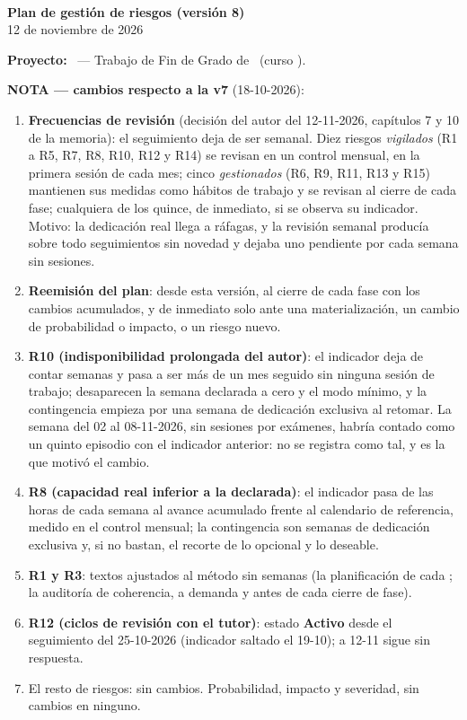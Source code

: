 \documentclass[11pt,a4paper]{article}
\begin{document}
\begin{center}
  {\Huge\bfseries\bukit}\\[0.5cm]
  {\Large\bfseries Plan de gestión de riesgos (versión 8)}\\[0.4cm]
  {\large 12 de noviembre de 2026}
\end{center}
\vspace{0.6cm}

\textbf{Proyecto:} \thesisTitle\ — Trabajo de Fin de Grado de \thesisAuthor\ (curso \thesisCourse).

\textbf{NOTA — cambios respecto a la v7} (18-10-2026):
\begin{enumerate}
  \item \textbf{Frecuencias de revisión} (decisión del autor del 12-11-2026, capítulos 7 y 10 de la memoria): el seguimiento deja de ser semanal.
  Diez riesgos \emph{vigilados} (R1 a R5, R7, R8, R10, R12 y R14) se revisan en un control mensual, en la primera sesión de cada mes; cinco \emph{gestionados} (R6, R9, R11, R13 y R15) mantienen sus medidas como hábitos de trabajo y se revisan al cierre de cada fase; cualquiera de los quince, de inmediato, si se observa su indicador.
  Motivo: la dedicación real llega a ráfagas, y la revisión semanal producía sobre todo seguimientos sin novedad y dejaba uno pendiente por cada semana sin sesiones.
  \item \textbf{Reemisión del plan}: desde esta versión, al cierre de cada fase con los cambios acumulados, y de inmediato solo ante una materialización, un cambio de probabilidad o impacto, o un riesgo nuevo.
  \item \textbf{R10 (indisponibilidad prolongada del autor)}: el indicador deja de contar semanas y pasa a ser más de un mes seguido sin ninguna sesión de trabajo; desaparecen la semana declarada a cero y el modo mínimo, y la contingencia empieza por una semana de dedicación exclusiva al retomar.
  La semana del 02 al 08-11-2026, sin sesiones por exámenes, habría contado como un quinto episodio con el indicador anterior: no se registra como tal, y es la que motivó el cambio.
  \item \textbf{R8 (capacidad real inferior a la declarada)}: el indicador pasa de las horas de cada semana al avance acumulado frente al calendario de referencia, medido en el control mensual; la contingencia son semanas de dedicación exclusiva y, si no bastan, el recorte de lo opcional y lo deseable.
  \item \textbf{R1 y R3}: textos ajustados al método sin semanas (la planificación de cada ; la auditoría de coherencia, a demanda y antes de cada cierre de fase).
  \item \textbf{R12 (ciclos de revisión con el tutor)}: estado \textbf{Activo} desde el seguimiento del 25-10-2026 (indicador saltado el 19-10); a 12-11 sigue sin respuesta.
  \item El resto de riesgos: sin cambios. Probabilidad, impacto y severidad, sin cambios en ninguno.
\end{enumerate}
\end{document}
